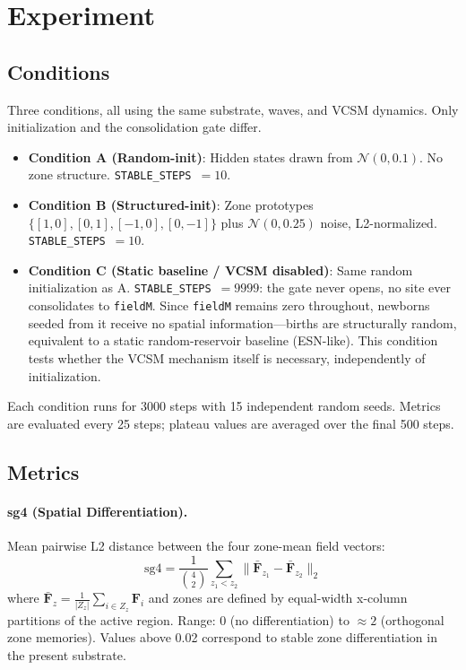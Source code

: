 \documentclass[11pt,twocolumn]{article}
\begin{document}
\section{Experiment}

\subsection{Conditions}

Three conditions, all using the same substrate, waves, and VCSM dynamics.
Only initialization and the consolidation gate differ.

\begin{itemize}
  \item \textbf{Condition A (Random-init)}: Hidden states drawn from
        $\mathcal{N}(0, 0.1)$. No zone structure. \texttt{STABLE\_STEPS}~$= 10$.
  \item \textbf{Condition B (Structured-init)}: Zone prototypes
        $\{[1,0],[0,1],[-1,0],[0,-1]\}$ plus $\mathcal{N}(0,0.25)$ noise,
        L2-normalized. \texttt{STABLE\_STEPS}~$= 10$.
  \item \textbf{Condition C (Static baseline / VCSM disabled)}: Same random
        initialization as A. \texttt{STABLE\_STEPS}~$= 9999$: the gate never
        opens, no site ever consolidates to \texttt{fieldM}. Since
        \texttt{fieldM} remains zero throughout, newborns seeded from it receive
        no spatial information---births are structurally random, equivalent to a
        static random-reservoir baseline (ESN-like). This condition tests whether
        the VCSM mechanism itself is necessary, independently of initialization.
\end{itemize}

Each condition runs for 3000 steps with 15 independent random seeds.
Metrics are evaluated every 25 steps; plateau values are averaged over the
final 500 steps.

\subsection{Metrics}

\paragraph{sg4 (Spatial Differentiation).}
Mean pairwise L2 distance between the four zone-mean field vectors:
\[
\text{sg4} = \frac{1}{\binom{4}{2}} \sum_{z_1 < z_2}
\bigl\|\bar{\mathbf{F}}_{z_1} - \bar{\mathbf{F}}_{z_2}\bigr\|_2
\]
where $\bar{\mathbf{F}}_z = \frac{1}{|Z_z|}\sum_{i \in Z_z} \mathbf{F}_i$
and zones are defined by equal-width x-column partitions of the active region.
Range: 0 (no differentiation) to $\approx 2$ (orthogonal zone memories).
Values above 0.02 correspond to stable zone differentiation in the present substrate.
\end{document}
